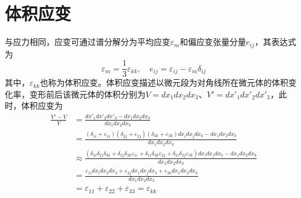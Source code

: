 \section{体积应变}
与应力相同，应变可通过谱分解分为平均应变$\varepsilon_m$和偏应变张量分量$e_{ij}$，其表达式为
\begin{equation}
\varepsilon_m = \frac{1}{3}\varepsilon_{kk},\quad e_{ij} = \varepsilon_{ij} - \varepsilon_m \delta_{ij} 
\end{equation}
其中，$\varepsilon_{kk}$也称为体积应变。体积应变描述以微元段为对角线所在微元体的体积变化率，变形前后该微元体的体积分别为$V=dx_1dx_2dx_3$、$V'=dx'_1dx'_2dx'_3$，此时，体积应变为
\begin{equation}
\begin{split}
    \frac{V'-V}{V} &= \frac{dx'_1dx'_2dx'_3-dx_1dx_2dx_3}{dx_1dx_2dx_3} \\
                   &= \frac{(\delta_{1i}+\varepsilon_{1i})(\delta_{2j}+\varepsilon_{2j})(\delta_{3k}+\varepsilon_{3k})dx_idx_jdx_k-dx_1dx_2dx_3}{dx_1dx_2dx_3}\\
                   &\approx \frac{(\delta_{1i}\delta_{2j}\delta_{3k}+\delta_{2j}\delta_{3k}\varepsilon_{1i}+\delta_{1i}\delta_{3k}\varepsilon_{2j}+\delta_{1i}\delta_{2j}\varepsilon_{3k})dx_idx_jdx_k-dx_1dx_2dx_3}{dx_1dx_2dx_3}\\
                   &= \frac{\varepsilon_{1i}dx_idx_2dx_3+\varepsilon_{2j}dx_1dx_jdx_3+\varepsilon_{3k}dx_1dx_2dx_k}{dx_1dx_2dx_3}\\
                   &= \varepsilon_{11}+\varepsilon_{22}+\varepsilon_{33}=\varepsilon_{kk}\\
\end{split}
\end{equation}
